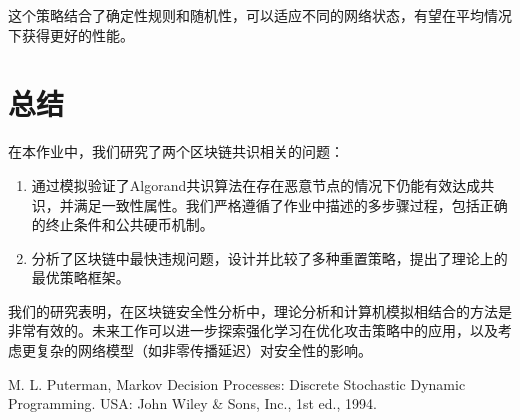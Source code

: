 \documentclass[12pt,a4paper]{article}
\begin{document}
\begin{CJK}{UTF8}{gbsn}
这个策略结合了确定性规则和随机性，可以适应不同的网络状态，有望在平均情况下获得更好的性能。

\section{总结}

在本作业中，我们研究了两个区块链共识相关的问题：

\begin{enumerate}
    \item 通过模拟验证了Algorand共识算法在存在恶意节点的情况下仍能有效达成共识，并满足一致性属性。我们严格遵循了作业中描述的多步骤过程，包括正确的终止条件和公共硬币机制。
    \item 分析了区块链中最快违规问题，设计并比较了多种重置策略，提出了理论上的最优策略框架。
\end{enumerate}

我们的研究表明，在区块链安全性分析中，理论分析和计算机模拟相结合的方法是非常有效的。未来工作可以进一步探索强化学习在优化攻击策略中的应用，以及考虑更复杂的网络模型（如非零传播延迟）对安全性的影响。

\begin{thebibliography}{9}
M. L. Puterman, Markov Decision Processes: Discrete Stochastic Dynamic Programming. USA: John Wiley \& Sons, Inc., 1st ed., 1994.
\end{thebibliography}

\end{CJK}
\end{document}
